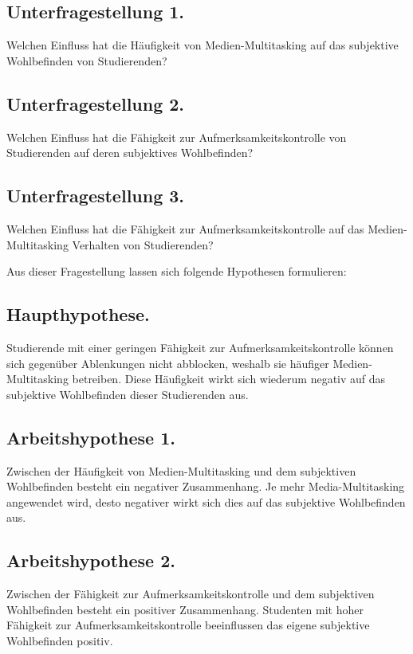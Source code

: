 \subsection{Unterfragestellung 1.} Welchen Einfluss hat die Häufigkeit von Medien-Multitasking auf das subjektive Wohlbefinden von Studierenden?

\subsection{Unterfragestellung 2.} Welchen Einfluss hat die Fähigkeit zur Aufmerksamkeitskontrolle von Studierenden auf deren subjektives Wohlbefinden?

\subsection{Unterfragestellung 3.} Welchen Einfluss hat die Fähigkeit zur Aufmerksamkeitskontrolle auf das Medien-Multitasking Verhalten von Studierenden?
\par
Aus dieser Fragestellung lassen sich folgende Hypothesen formulieren:

\subsection{Haupthypothese.}
Studierende mit einer geringen Fähigkeit zur Aufmerksamkeitskontrolle können sich gegenüber Ablenkungen nicht abblocken, weshalb sie häufiger Medien-Multitasking betreiben. Diese Häufigkeit wirkt sich wiederum negativ auf das subjektive Wohlbefinden dieser Studierenden aus.

\subsection{Arbeitshypothese 1.} Zwischen der Häufigkeit von Medien-Multitasking und dem subjektiven Wohlbefinden besteht ein negativer Zusammenhang. Je mehr Media-Multitasking angewendet wird, desto negativer wirkt sich dies auf das subjektive Wohlbefinden aus.

\subsection{Arbeitshypothese 2.} Zwischen der Fähigkeit zur Aufmerksamkeitskontrolle und dem subjektiven Wohlbefinden besteht ein positiver Zusammenhang. Studenten mit hoher Fähigkeit zur Aufmerksamkeitskontrolle beeinflussen das eigene subjektive Wohlbefinden positiv.

